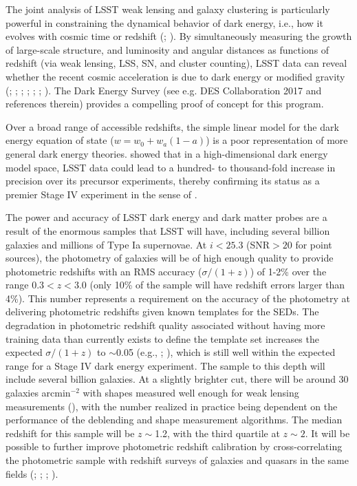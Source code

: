 The joint analysis of LSST weak lensing and galaxy clustering is
particularly powerful in constraining the dynamical behavior of dark
energy, i.e., how it evolves with cosmic time or redshift (\cite{Hu2004}; \cite{Zhan2006a}).  By
simultaneously measuring the growth of large-scale structure, and
luminosity and angular distances as functions of redshift (via weak
lensing, LSS, SN, and cluster counting), LSST data can reveal whether
the recent cosmic acceleration is due to dark energy or modified
gravity (\cite{Lue2004}; \cite{Knox2006};
\cite{Ishak2006}; \cite{Jain2008}; \cite{Oguri2011};
\cite{Jain2013}; \cite{Weinberg2013}). The Dark Energy Survey (see e.g. DES Collaboration 2017 \cite{DESC2017} and references therein) provides a compelling proof of concept for this program.

Over a broad range of accessible redshifts, the simple linear model
for the dark energy equation of state ($w = w_0 + w_a(1-a)$) is a poor representation of more
general dark energy theories. \cite{Barnard2008} showed that in a high-dimensional dark energy model space,
LSST data could lead to a hundred- to thousand-fold increase in precision over its
precursor experiments, thereby confirming its status as
a premier Stage IV experiment in the sense of \cite{Albrecht2006}.

The power and accuracy of LSST dark energy and dark matter probes are
a result of the enormous samples that LSST will have, including
several billion galaxies and millions of Type Ia
supernovae. At $i < 25.3$ (SNR${}>20$ for point sources), the
photometry of galaxies will be of high enough quality to provide
photometric redshifts with an RMS accuracy ($\sigma/(1+z)$) of 1-2\%
over the range $0.3 < z < 3.0$ (only
10\% of the sample will have redshift errors larger than 4\%).
This number represents a requirement on the accuracy of the photometry at delivering photometric
redshifts given known templates for the SEDs.  The degradation in photometric redshift quality associated without having more
training data than currently exists to define the template set increases the
expected $\sigma/(1+z)$ to $\sim$0.05 (e.g., \cite{Newman2015}; \cite{Graham2017}), which is still well within the
expected range for a Stage IV dark energy experiment.  The
sample to this depth will include several billion galaxies.  At a
slightly brighter cut, there will be around 30 galaxies arcmin$^{-2}$
with shapes measured well enough for weak lensing measurements (\cite{Chang2013,Chang2015}),
with the number realized in practice being dependent on
the performance of the deblending and shape measurement algorithms.
The median redshift for
this sample will be $z\sim$1.2, with the third quartile at $z\sim2$.
It will be possible to further improve photometric redshift calibration
by cross-correlating the photometric sample with redshift surveys of
galaxies and quasars in the same fields (\cite{Newman2008}; \cite{Matthews2010};
\cite{Menard2013}; \cite{Davis2017}).


